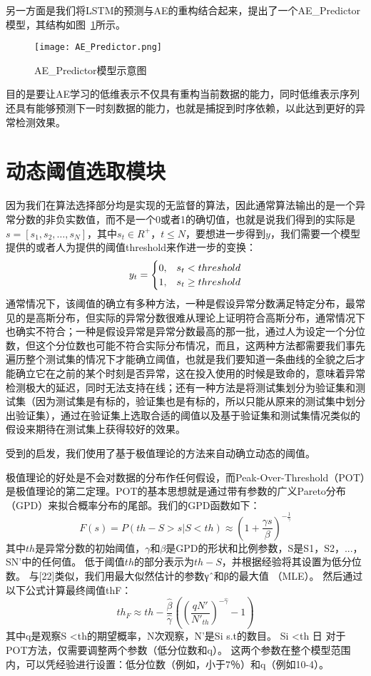 另一方面是我们将LSTM的预测与AE的重构结合起来，提出了一个AE\_Predictor模型，其结构如图~\ref{fig:AE_Predictor}所示。

\begin{figure}[htbp]
  \centering
  \texttt{[image: AE\_Predictor.png]}
  \caption{AE\_Predictor模型示意图}
  \label{fig:AE_Predictor}
\end{figure}

目的是要让AE学习的低维表示不仅具有重构当前数据的能力，同时低维表示序列还具有能够预测下一时刻数据的能力，也就是捕捉到时序依赖，以此达到更好的异常检测效果。

\section{动态阈值选取模块}
因为我们在算法选择部分均是实现的无监督的算法，因此通常算法输出的是一个异常分数的非负实数值，而不是一个0或者1的确切值，也就是说我们得到的实际是$s = [s_1, s_2,\dots,s_N]$，其中$s_t\in R^+$，$t\leq N$，要想进一步得到$y$，我们需要一个模型提供的或者人为提供的阈值threshold来作进一步的变换：
\begin{equation}
  y_t = \begin{cases}
    0, & s_t < threshold \cr
    1, & s_t \geq threshold
  \end{cases}
\end{equation}
通常情况下，该阈值的确立有多种方法，一种是假设异常分数满足特定分布，最常见的是高斯分布，但实际的异常分数很难从理论上证明符合高斯分布，通常情况下也确实不符合；一种是假设异常是异常分数最高的那一批，通过人为设定一个分位数，但这个分位数也可能不符合实际分布情况，而且，这两种方法都需要我们事先遍历整个测试集的情况下才能确立阈值，也就是我们要知道一条曲线的全貌之后才能确立它在之前的某个时刻是否异常，这在投入使用的时候是致命的，意味着异常检测极大的延迟，同时无法支持在线；还有一种方法是将测试集划分为验证集和测试集（因为测试集是有标的，验证集也是有标的，所以只能从原来的测试集中划分出验证集），通过在验证集上选取合适的阈值以及基于验证集和测试集情况类似的假设来期待在测试集上获得较好的效果。

受到\cite{siffer2017anomaly}的启发，我们使用了基于极值理论的方法来自动确立动态的阈值。

极值理论的好处是不会对数据的分布作任何假设，而Peak-Over-Threshold（POT）是极值理论的第二定理。POT的基本思想就是通过带有参数的广义Pareto分布（GPD）来拟合概率分布的尾部。我们的GPD函数如下：
\begin{equation}
  F(s) = P(th - S > s | S < th) \approx (1 + \frac{\gamma s}{\beta})^{-\frac{1}{\gamma}}
\end{equation}
其中$th$是异常分数的初始阈值，$\gamma$和$\beta$是GPD的形状和比例参数，S是{S1，S2，...，SN'}中的任何值。 低于阈值$th$的部分表示为$th-S$，并根据经验将其设置为低分位数。 与[22]类似，我们用最大似然估计的参数γˆ和β的最大值
（MLE）。 然后通过以下公式计算最终阈值thF：
\begin{equation}
  th_F \approx th - \frac{\hat{\beta}}{\hat{\gamma}}((\frac{qN'}{N'_{th}})^{-\hat{\gamma}}-1)
\end{equation}
其中q是观察S <th的期望概率，N次观察，N'是Si s.t的数目。 Si <th
日
对于POT方法，仅需要调整两个参数（低分位数和q）。 这两个参数在整个模型范围内，可以凭经验进行设置：低分位数（例如，小于7％）和q（例如10-4）\cite{siffer2017anomaly}。

